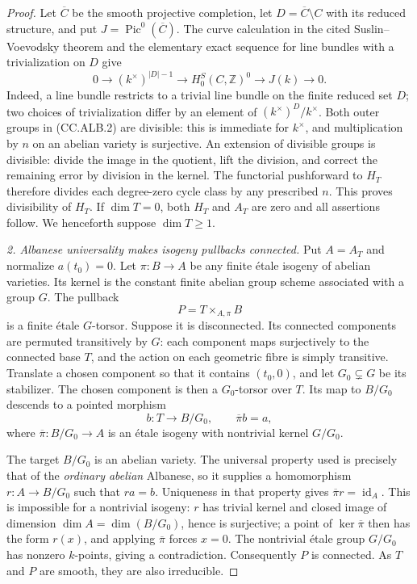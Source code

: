 \begin{proof}
Let $\overline C$ be the smooth projective completion,
let $D=\overline C\setminus C$ with its reduced structure,
and put $J=\operatorname{Pic}^0(\overline C)$.
The curve calculation in the cited Suslin--Voevodsky
theorem and the elementary exact sequence for line
bundles with a trivialization on $D$ give
\[
 0\longrightarrow (k^\times)^{|D|-1}
 \longrightarrow H^S_0(C,\mathbb Z)^0
 \longrightarrow J(k)\longrightarrow0.             \tag{CC.ALB.2}
\]
Indeed, a line bundle restricts to a trivial line bundle
on the finite reduced set $D$; two choices of
trivialization differ by an element of
$(k^\times)^D/k^\times$.
Both outer groups in (CC.ALB.2) are divisible:
this is immediate for $k^\times$, and multiplication
by $n$ on an abelian variety is surjective.
An extension of divisible groups is divisible: divide
the image in the quotient, lift the division, and
correct the remaining error by division in the kernel.
The functorial pushforward to $H_T$ therefore divides
each degree-zero cycle class by any prescribed $n$.
This proves divisibility of $H_T$.  If $\dim T=0$,
both $H_T$ and $A_T$ are zero and all assertions follow.
We henceforth suppose $\dim T\geq1$.

\emph{2. Albanese universality makes isogeny pullbacks
connected.}
Put $A=A_T$ and normalize $a(t_0)=0$.
Let $\pi:B\to A$ be any finite \'{e}tale isogeny of
abelian varieties.  Its kernel is the constant finite
abelian group scheme associated with a group $G$.
The pullback
\[
 P=T\times_{A,\pi}B
\]
is a finite \'{e}tale $G$-torsor.
Suppose it is disconnected.  Its connected components
are permuted transitively by $G$: each component maps
surjectively to the connected base $T$, and the action
on each geometric fibre is simply transitive.
Translate a chosen component so that it contains
$(t_0,0)$, and let $G_0\subsetneq G$ be its stabilizer.
The chosen component is then a $G_0$-torsor over $T$.
Its map to $B/G_0$ descends to a pointed morphism
\[
 b:T\longrightarrow B/G_0,\qquad \overline\pi b=a,
\]
where $\overline\pi:B/G_0\to A$ is an \'{e}tale isogeny
with nontrivial kernel $G/G_0$.

The target $B/G_0$ is an abelian variety.
The universal property used is precisely that of the
\emph{ordinary abelian} Albanese, so it supplies a
homomorphism $r:A\to B/G_0$ such that $ra=b$.
Uniqueness in that property gives
$\overline\pi r=\operatorname{id}_A$.
This is impossible for a nontrivial isogeny:
$r$ has trivial kernel and closed image of dimension
$\dim A=\dim(B/G_0)$, hence is surjective;
a point of $\ker\overline\pi$ then has the form $r(x)$,
and applying $\overline\pi$ forces $x=0$.
The nontrivial \'{e}tale group $G/G_0$ has nonzero
$k$-points, giving a contradiction.
Consequently $P$ is connected.
As $T$ and $P$ are smooth, they are also irreducible.


\end{proof}
